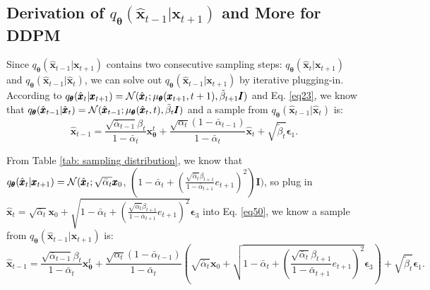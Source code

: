 \documentclass{article} \usepackage{iclr2024_conference,times}
\begin{document}
\subsection{Derivation of \texorpdfstring{$q_{\pmb{\theta}}(\hat{\pmb{x}}_{t-1} | \pmb{x}_{t+1})$}{Lg} and More for DDPM}
\label{Append:1.1}
Since $q_{\pmb{\theta}}(\hat{\pmb{x}}_{t-1} | \pmb{x}_{t+1})$ contains two consecutive sampling steps: $q_{\pmb{\theta}}(\hat{\pmb{x}}_{t} | \pmb{x}_{t+1})$ and $q_{\pmb{\theta}}(\hat{\pmb{x}}_{t-1} | \hat{\pmb{x}}_{t})$, we can solve out $q_{\pmb{\theta}}(\hat{\pmb{x}}_{t-1} | \pmb{x}_{t+1})$ by iterative plugging-in. According to $q_{\pmb{\theta}}(\hat{\pmb{x}}_{t} | \pmb{x}_{t+1}) = {\cal N} (\hat{\pmb{x}}_{t}; \mu_{\pmb{\theta}}(\pmb{x}_{t+1}, t+1), \tilde{\beta}_{t+1} \pmb{I})$ and Eq. \ref{eq23}, we know that $q_{\pmb{\theta}}(\hat{\pmb{x}}_{t-1} | \hat{\pmb{x}}_{t}) = {\cal N} (\hat{\pmb{x}}_{t-1}; \mu_{\pmb{\theta}}(\hat{\pmb{x}}_{t}, t), \tilde{\beta}_{t} \pmb{I})$ and a sample from $q_{\pmb{\theta}}(\hat{\pmb{x}}_{t-1} | \hat{\pmb{x}}_{t})$ is:
\begin{equation}
\label{eq50}
\hat{\pmb{x}}_{t-1} = \frac{\sqrt{\bar{\alpha}_{t-1}} \beta_{t}}{1-\bar{\alpha}_{t}} \pmb{x}^{t}_{\pmb{\theta}} + \frac{\sqrt{\alpha_{t}}(1-\bar{\alpha}_{t-1})}{1-\bar{\alpha}_{t}} \hat{\pmb{x}}_{t} + \sqrt{ \tilde{\beta}_{t}} \pmb{\epsilon}_1.
\end{equation}


\noindent
From Table \ref{tab: sampling distribution}, we know that $q_{\pmb{\theta}}(\hat{\pmb{x}}_{t} | \pmb{x}_{t+1}) = {\cal N} (\hat{\pmb{x}}_{t}; \sqrt{\bar{\alpha}_t} \pmb{x}_0$, $(1-\bar{\alpha}_t + (\frac{\sqrt{\bar{\alpha}_t} \beta_{t+1}}{1-\bar{\alpha}_{t+1}} e_{t+1})^2) \pmb{I})$, so plug in $\hat{\pmb{x}}_{t} = \sqrt{\bar{\alpha}_t} \pmb{x}_0 + \sqrt{1-\bar{\alpha}_t + (\frac{\sqrt{\bar{\alpha}_t} \beta_{t+1}}{1-\bar{\alpha}_{t+1}} e_{t+1})^2 } \pmb{\epsilon}_3$ into Eq. \ref{eq50}, we know a sample from $q_{\pmb{\theta}}(\hat{\pmb{x}}_{t-1} | \pmb{x}_{t+1})$ is:
\begin{equation}
\label{eq51}
\hat{\pmb{x}}_{t-1} = \frac{\sqrt{\bar{\alpha}_{t-1}} \beta_{t}}{1-\bar{\alpha}_{t}} \pmb{x}^{t}_{\pmb{\theta}} + \frac{\sqrt{\alpha_{t}}(1-\bar{\alpha}_{t-1})}{1-\bar{\alpha}_{t}} (\sqrt{\bar{\alpha}_t} \pmb{x}_0 + \sqrt{1-\bar{\alpha}_t + (\frac{\sqrt{\bar{\alpha}_t} \beta_{t+1}}{1-\bar{\alpha}_{t+1}} e_{t+1})^2 } \pmb{\epsilon}_3) + \sqrt{ \tilde{\beta}_{t}} \pmb{\epsilon}_1.
\end{equation}
\end{document}
